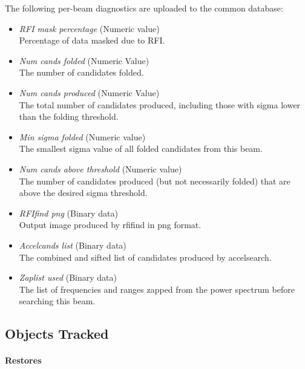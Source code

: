 The following per-beam diagnostics are uploaded to the common database:
\begin{itemize}
    \item \textit{RFI mask percentage} (Numeric value) \hfill \\
        Percentage of data masked due to RFI.

    \item \textit{Num cands folded} (Numeric Value) \hfill \\
        The number of candidates folded.

    \item \textit{Num cands produced} (Numeric Value) \hfill \\
        The total number of candidates produced, including those with sigma lower than the folding threshold.

    \item \textit{Min sigma folded} (Numeric value) \hfill \\
        The smallest sigma value of all folded candidates from this beam.

    \item \textit{Num cands above threshold} (Numeric value) \hfill \\
        The number of candidates produced (but not necessarily folded) that are above the desired sigma threshold.
    
    \item \textit{RFIfind png} (Binary data) \hfill \\
        Output image produced by rfifind in png format.

    \item \textit{Accelcands list} (Binary data) \hfill \\
        The combined and sifted list of candidates produced by accelsearch.
    
    \item \textit{Zaplist used} (Binary data) \hfill \\
        The list of frequencies and ranges zapped from the power spectrum before searching this beam.
\end{itemize}

\subsection{Objects Tracked}
\paragraph{Restores}

